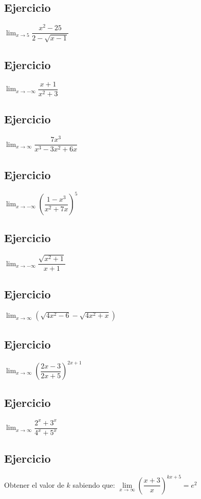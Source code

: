 \documentclass[10pt, a4paper]{article}
\begin{document}
\subsection{Ejercicio}
\label{sec:orgb5bb5d4}
\(\displaystyle\lim_{ {x} \rightarrow {5} } {\dfrac{x^2-25}{2-\sqrt{x-1}}}\)
\subsection{Ejercicio}
\label{sec:org861ccc4}
\(\displaystyle\lim_{ {x} \rightarrow {-\infty} } {\dfrac{x+1}{x^2+3}}\)
\subsection{Ejercicio}
\label{sec:org91c47d3}
\(\displaystyle\lim_{ {x} \rightarrow {\infty} } {\dfrac{7x^3}{x^3-3x^2+6x}}\)
\subsection{Ejercicio}
\label{sec:org4a84562}
\(\displaystyle\lim_{ {x} \rightarrow {-\infty} } {\left(\dfrac{1-x^3}{x^2+7x}\right)^5}\)
\subsection{Ejercicio}
\label{sec:org25b7bb2}
\(\displaystyle\lim_{ {x} \rightarrow {-\infty} } {\dfrac{\sqrt{x^2+1}}{x+1}}\)
\subsection{Ejercicio}
\label{sec:org5c96fee}
\(\displaystyle\lim_{ {x} \rightarrow {\infty} } {\left(\sqrt{4x^2-6}-\sqrt{4x^2+x}\right)}\)
\subsection{Ejercicio}
\label{sec:org4b31495}
\(\displaystyle\lim_{ {x} \rightarrow {\infty} } {\left(\dfrac{2x-3}{2x+5}\right)^{2x+1}}\)
\subsection{Ejercicio}
\label{sec:org9b3b4e2}
\(\displaystyle\lim_{ {x} \rightarrow {\infty} } {\dfrac{2^x+3^x}{4^x+5^x}}\)
\subsection{Ejercicio}
\label{sec:org21fac46}
Obtener el valor de \(k\) sabiendo que:
    \(\underset{x \rightarrow \infty}{\lim} \left( \dfrac{x + 3}{x}
    \right)^{k x + 5} = e^2\)
\end{document}
